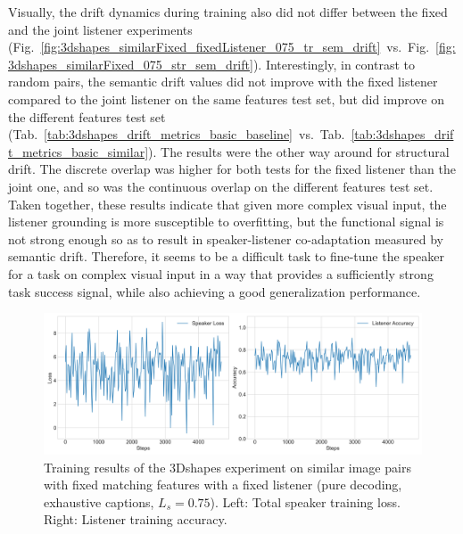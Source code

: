 Visually, the drift dynamics during training also did not differ between the fixed and the joint listener experiments (Fig.~\ref{fig:3dshapes_similarFixed_fixedListener_075_tr_sem_drift}~vs.~Fig.~\ref{fig:3dshapes_similarFixed_075_str_sem_drift}). Interestingly, in contrast to random pairs, the semantic drift values did not improve with the fixed listener compared to the joint listener on the same features test set, but did improve on the different features test set (Tab.~\ref{tab:3dshapes_drift_metrics_basic_baseline}~vs.~Tab.~\ref{tab:3dshapes_drift_metrics_basic_similar}). The results were the other way around for structural drift. The discrete overlap was higher for both tests for the fixed listener than the joint one, and so was the continuous overlap on the different features test set. 
Taken together, these results indicate that given more complex visual input, the listener grounding is more susceptible to overfitting, but the functional signal is not strong enough so as to result in speaker-listener co-adaptation measured by semantic drift. Therefore, it seems to be a difficult task to fine-tune the speaker for a task on complex visual input in a way that provides a sufficiently strong task success signal, while also achieving a good generalization performance. 

\begin{figure}[h]
	\centering
	\includegraphics[width=\linewidth]{images/3dshapes_fixedListener_similarFixed_exh_075_losses.png}
	\caption{Training results of the 3Dshapes experiment on similar image pairs with fixed matching features with a fixed listener (pure decoding, exhaustive captions, $L_s = 0.75$). Left: Total speaker training loss. Right: Listener training accuracy.}
	\label{fig:3dshapes_similarFixed_fixedListener_075_speaker_loss_listener_acc}
\end{figure}

